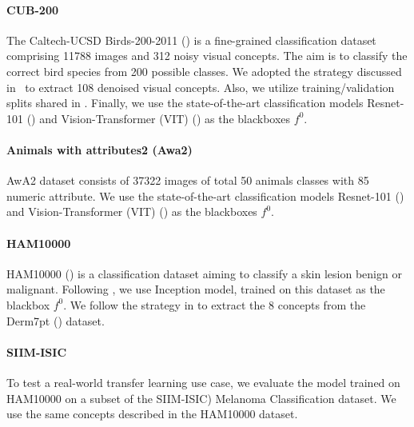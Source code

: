 \paragraph{CUB-200}
The Caltech-UCSD Birds-200-2011 (\cite{wah2011caltech}) is a fine-grained classification dataset comprising 11788 images and 312 noisy visual concepts. The aim is to classify the correct bird species from 200 possible classes. We adopted the strategy discussed in~\cite{barbiero2022entropy} to extract 108 denoised visual concepts. Also, we utilize training/validation splits shared in \cite{barbiero2022entropy}. Finally, we use the state-of-the-art classification models Resnet-101 (\cite{he2016deep}) and Vision-Transformer (VIT) (\cite{wang2021feature}) as the blackboxes $f^0$. 


\paragraph{Animals with attributes2 (Awa2)}
 AwA2 dataset \cite{xian2018zero} consists of 37322 images of total 50 animals classes with 85 numeric attribute. We use the state-of-the-art classification models Resnet-101 (\cite{he2016deep}) and Vision-Transformer (VIT) (\cite{wang2021feature}) as the blackboxes $f^0$.

\paragraph{HAM10000}
HAM10000 (\cite{tschandl2018ham10000}) is a classification dataset aiming to classify a skin lesion benign or malignant. Following \cite{daneshjou2021disparities}, we use Inception \cite{szegedy2015going} model, trained on this dataset as the blackbox $f^0$. We follow the strategy in \cite{lucieri2020interpretability} to extract the 8 concepts from the Derm7pt (\cite{kawahara2018seven}) dataset.

\paragraph{SIIM-ISIC}
To test a real-world transfer learning use case, we evaluate the
model trained on HAM10000 on a subset of the SIIM-ISIC\cite{rotemberg2021patient}) Melanoma Classification dataset. We use
the same concepts described in the HAM10000 dataset.


